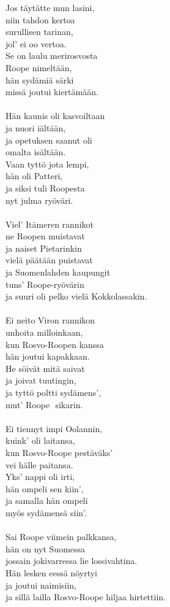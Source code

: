 
Jos täytätte mun lasini, \\ niin tahdon kertoa \\ surullisen tarinan, \\ jol' ei oo vertoa. \\ Se on laulu merirosvosta \\ Roope nimeltään, \\ hän sydämiä särki \\ missä joutui kiertämään. \\ \hspace{10mm} \\ Hän kaunis oli kasvoiltaan \\ ja nuori iältään, \\ ja opetuksen saanut oli \\ omalta isältään. \\ Vaan tyttö jota lempi, \\ hän oli Patteri, \\ ja siksi tuli Roopesta \\ nyt julma ryöväri. \\ \hspace{10mm} \\ Viel' Itämeren rannikot \\ ne Roopen muistavat \\ ja naiset Pietarinkin \\ vielä päätään puistavat \\ ja Suomenlahden kaupungit \\ tuns' Roope-ryövärin \\ ja suuri oli pelko vielä Kokkolassakin. \\ \hspace{10mm} \\ Ei neito Viron rannikon \\ unhoita milloinkaan, \\ kun Rosvo-Roopen kanssa \\ hän joutui kapakkaan. \\ He söivät mitä saivat \\ ja joivat tuutingin, \\ ja tyttö poltti sydämens', \\ mut' Roope  sikarin. \\ \hspace{10mm} \\ Ei tiennyt impi Oolannin, \\ kuink' oli laitansa, \\ kun Rosvo-Roope pestäväks' \\ vei hälle paitansa. \\ Yks' nappi oli irti, \\ hän ompeli sen kiin', \\ ja samalla hän ompeli \\ myös sydämensä siin'. \\ \hspace{10mm} \\ Sai Roope viimein palkkansa, \\ hän on nyt Suomessa \\ jossain jokivarressa lie lossivahtina. \\ Hän lesken eessä nöyrtyi \\ ja joutui naimisiin, \\ ja sillä lailla Rosvo-Roope hiljaa hirtettiin.